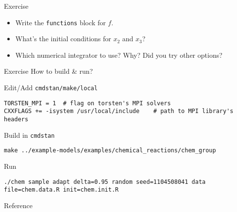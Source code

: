 \documentclass[presentation]{beamer}
\begin{document}
\begin{frame}[fragile,label={sec:orgab9534a}]{Exercise}
 \begin{itemize}
\item Write the \texttt{functions} block for \(f\).
\item What's the initial conditions for \(x_2\) and \(x_3\)?
\item Which numerical integrator to use? Why? Did you try other options?
\end{itemize}
\end{frame}

\begin{frame}[fragile,label={sec:org4f54f7f}]{Exercise}
 How to build \& run?
\begin{block}{Edit/Add \texttt{cmdstan/make/local}}
\begin{verbatim}
TORSTEN_MPI = 1  # flag on torsten's MPI solvers
CXXFLAGS += -isystem /usr/local/include    # path to MPI library's headers
\end{verbatim}
\end{block}
\begin{block}{Build in \texttt{cmdstan}}
\begin{verbatim}
make ../example-models/examples/chemical_reactions/chem_group
\end{verbatim}
\end{block}
\begin{block}{Run}
\begin{verbatim}
./chem sample adapt delta=0.95 random seed=1104508041 data file=chem.data.R init=chem.init.R
\end{verbatim}
\end{block}
\end{frame}

\begin{frame}[label={sec:org0ca32ba}]{Reference}


\end{frame}
\end{document}
